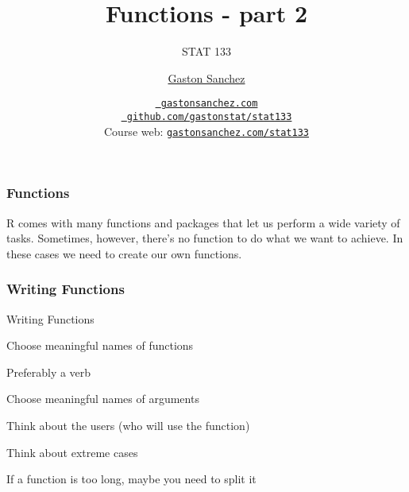 \documentclass[12pt]{beamer}\usepackage[]{graphicx}\usepackage[]{color}
\title{Functions - part 2}
\subtitle{STAT 133}
\author{\href{http://www.gastonsanchez.com}{Gaston Sanchez}}
\institute{Department of Statistics, UC{\textendash}Berkeley}
\date{\href{http://www.gastonsanchez.com}{\tt \scriptsize \color{foreground} gastonsanchez.com}
\\[-4pt]
\href{http://github.com/gastonstat/stat133}{\tt \scriptsize \color{foreground} github.com/gastonstat/stat133}
\\[-4pt]
{\scriptsize Course web: \href{http://www.gastonsanchez.com/stat133}{\tt gastonsanchez.com/stat133}}
}
\begin{document}
{
  \frame{
    \titlepage
  } 
}


\begin{frame}
\frametitle{Functions}

R comes with many functions and packages that let us perform a wide variety of tasks. Sometimes, however, there's no function to do what we want to achieve. In these cases we need to create our own functions.

\end{frame}


\begin{frame}
\begin{center}
\Huge{}
\end{center}
\end{frame}


\begin{frame}[fragile]
\frametitle{Writing Functions}

Writing Functions
\bi
  \item Choose meaningful names of functions
  \item Preferably a verb
  \item Choose meaningful names of arguments
  \item Think about the users (who will use the function)
  \item Think about extreme cases
  \item If a function is too long, maybe you need to split it
\ei

\end{frame}

\end{document}
